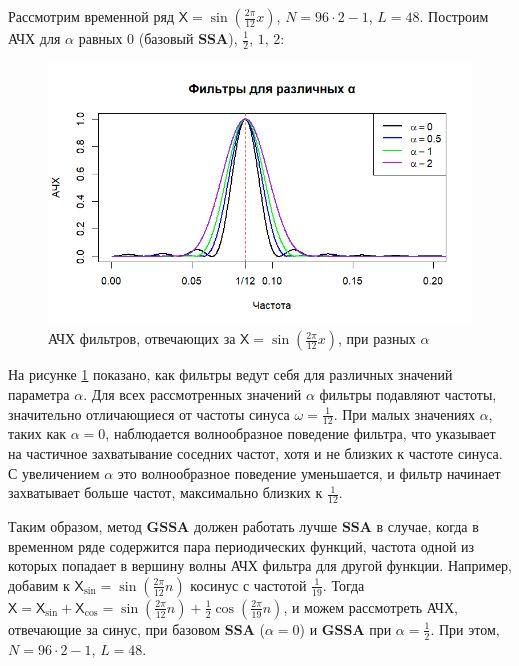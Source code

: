 \documentclass[a4paper, 11pt]{article}
\newcommand{\SSA}{\textbf{SSA}}
\newcommand{\GSSA}{\textbf{GSSA}}
\newcommand{\TS}{\mathsf{X}}
\begin{document}
Рассмотрим временной ряд $\TS = \sin\left(\frac{2\pi}{12}x\right)$, $N = 96 \cdot 2 - 1$, $L = 48$.
Построим АЧХ для $\alpha$ равных $0$ (базовый $\SSA$), $\frac{1}{2}$, $1$, $2$:
\begin{figure}[H]
	\centering
	\includegraphics[width=1\textwidth]{img/various_alphas.png}
	\caption{АЧХ фильтров, отвечающих за $\TS = \sin\left(\frac{2\pi}{12}x\right)$, при разных $\alpha$}
	\label{fig:various_alphas}
\end{figure}
На рисунке \ref{fig:various_alphas} показано, как фильтры ведут себя для различных значений параметра \(\alpha\). Для всех рассмотренных значений \(\alpha\) фильтры подавляют частоты, значительно отличающиеся от частоты синуса $ \omega = \frac{1}{12}$. При малых значениях \(\alpha\), таких как \(\alpha = 0\), наблюдается волнообразное поведение фильтра, что указывает на частичное захватывание соседних частот, хотя и не близких к частоте синуса. С увеличением \(\alpha\) это волнообразное поведение уменьшается, и фильтр начинает захватывает больше частот, максимально близких к \(\frac{1}{12}\). 

Таким образом, метод $\GSSA$ должен работать лучше $\SSA$ в случае, когда в временном ряде содержится пара периодических функций, частота одной из которых попадает в вершину волны АЧХ фильтра для другой функции. Например, добавим к $\TS_{\sin} = \sin\left(\frac{2\pi}{12} n \right)$ косинус с частотой $\frac{1}{19}$. Тогда $\TS = \TS_{\sin} + \TS_{\cos} = \sin\left(\frac{2\pi}{12} n \right) + \frac{1}{2}\cos\left(\frac{2\pi}{19} n \right)$, и можем рассмотреть АЧХ, отвечающие за синус, при базовом $\SSA$ ($\alpha = 0$) и $\GSSA$ при $\alpha = \frac{1}{2}$. При этом, $N = 96 \cdot 2 - 1$, $L = 48$.
 
\end{document}
